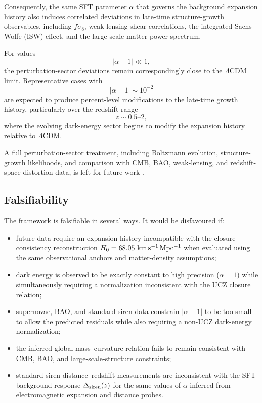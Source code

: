 \documentclass[12pt]{article}
\begin{document}
Consequently, the same SFT parameter \(\alpha\) that governs the
background expansion history also induces correlated deviations in
late-time structure-growth observables, including \(f\sigma_8\),
weak-lensing shear correlations, the integrated Sachs--Wolfe (ISW)
effect, and the large-scale matter power spectrum.

For values
\[
|\alpha-1|\ll1,
\]
the perturbation-sector deviations remain correspondingly close to the
\(\Lambda\)CDM limit. Representative cases with
\[
|\alpha-1|\sim10^{-2}
\]
are expected to produce percent-level modifications to the late-time
growth history, particularly over the redshift range
\[
z\sim0.5\text{--}2,
\]
where the evolving dark-energy sector begins to modify the expansion
history relative to \(\Lambda\)CDM.

A full perturbation-sector treatment, including Boltzmann evolution,
structure-growth likelihoods, and comparison with CMB, BAO, weak-lensing,
and redshift-space-distortion data, is left for future work
\cite{Lewis2000,Planck2018}.

\subsection{Falsifiability}

The framework is falsifiable in several ways. It would be disfavoured if:

\begin{itemize}

\item future data require an expansion history incompatible with the
closure-consistency reconstruction
$H_0=68.05~{\rm km\,s^{-1}\,Mpc^{-1}}$ when evaluated using the same
observational anchors and matter-density assumptions;

\item dark energy is observed to be exactly constant to high precision
($\alpha=1$) while simultaneously requiring a normalization inconsistent with
the UCZ closure relation;

\item supernovae, BAO, and standard-siren data constrain
$|\alpha-1|$ to be too small to allow the predicted residuals while also
requiring a non-UCZ dark-energy normalization;

\item the inferred global mass--curvature relation fails to remain consistent
with CMB, BAO, and large-scale-structure constraints;

\item standard-siren distance--redshift measurements are inconsistent
with the SFT background response $\Delta_{\rm siren}(z)$ for the same
values of $\alpha$ inferred from electromagnetic expansion and distance
probes.

\end{itemize}
\end{document}
